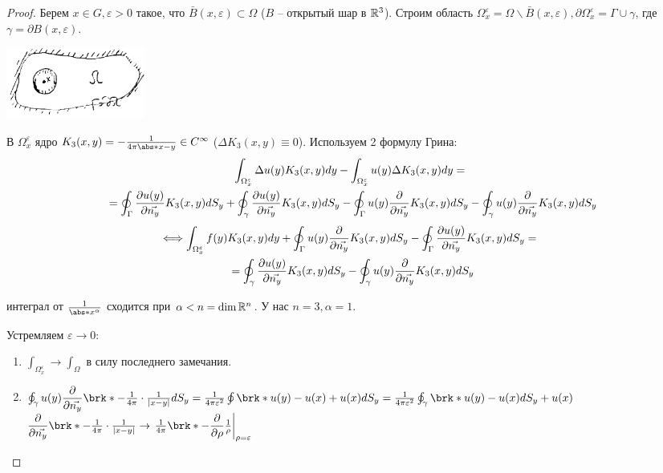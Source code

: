 \begin{proof}
Берем $x \in G, \varepsilon >0$ такое, что $\bar B(x,\varepsilon) \subset \Omega$ ($B$ -- открытый шар в $\mathbb{R}^3$). Строим область $\Omega_x^\varepsilon = \Omega \backslash \bar B(x, \varepsilon), \partial \Omega_x^\varepsilon = \Gamma \cup \gamma$, где $\gamma = \partial B(x,\varepsilon)$.\\
\begin{center}
\includegraphics[width=0.2\textwidth]{17_1_new}
\end{center}
В $\Omega_x^\varepsilon$ ядро $K_3(x,y) = - \frac{1}{4\pi \abs*{x-y}} \in C^\infty$ ($\Delta K_3(x,y) \equiv 0$). Используем 2 формулу Грина:
\begin{multline*}
\int_{\Omega_x^\varepsilon} \Delta u(y) K_3(x,y)dy - \int_{\Omega_x^\varepsilon} u(y) \Delta K_3(x,y)dy = {}\\
{}=\oint_\Gamma \dfrac{\partial u(y)}{\partial \vec{n_y}} K_3(x,y)dS_y + \oint_\gamma \dfrac{\partial u(y)}{\partial \vec{n_y}} K_3(x,y)dS_y - \oint_\Gamma u(y)\dfrac{\partial }{\partial \vec{n_y}} K_3(x,y) dS_y - \oint_\gamma u(y)\dfrac{\partial }{\partial \vec{n_y}} K_3(x,y) dS_y
\end{multline*}
\begin{multline*}
\Longleftrightarrow \int_{\Omega_x^\varepsilon} f(y) K_3(x,y)dy + \oint_\Gamma u(y)\dfrac{\partial }{\partial \vec{n_y}} K_3(x,y) dS_y - \oint_\Gamma \dfrac{\partial u(y)}{\partial \vec{n_y}} K_3(x,y)dS_y = {}\\
{} = \oint_\gamma \dfrac{\partial u(y)}{\partial \vec{n_y}} K_3(x,y)dS_y - \oint_\gamma u(y)\dfrac{\partial }{\partial \vec{n_y}} K_3(x,y) dS_y
\end{multline*}
\begin{offtop}
интеграл от $\frac{1}{\abs*{x}^\alpha}$ сходится при $\alpha < n = \mathrm{dim}\, \mathbb{R}^n$. У нас $n=3, \alpha =1$.
\end{offtop}
Устремляем $\varepsilon \rightarrow 0$:
\begin{enumerate}
\item $\int_{\Omega_x^\varepsilon} \rightarrow \int_\Omega$ в силу последнего замечания.
\item
$
\oint_\gamma u(y) \pd{}{\vec{n_y}} \brk*{-\frac{1}{4\pi} \cdot \frac{1}{|x-y|}}dS_y  = \frac{1}{4\pi \varepsilon^2} \oint \brk*{u(y) - u(x) + u(x)}dS_y = \frac{1}{4\pi \varepsilon^2} \oint_\gamma \brk*{u(y) - u(x)}dS_y + u(x)$\\
$\pd{}{\vec{n_y}} \brk*{-\frac{1}{4\pi} \cdot \frac{1}{|x-y|}} \rightarrow \left.\frac{1}{4\pi}\brk*{-\pd{}{\rho}\frac{1}{\rho}}\right|_{\rho = \varepsilon}$\\

\end{enumerate}
\end{proof}
